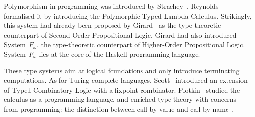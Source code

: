 \documentclass[11pt,twocolumn]{article}
\newcommand{\lcalculus}{\mbox{$\lambda$-calculus}}
\newcommand{\SystemF}{\mbox{System~$F$}}
\newcommand{\SystemFomega}{\mbox{System~$F_\omega$}}
\begin{document}
Polymorphism in programming %
was introduced by Strachey~\cite{Strachey1967}.
%
Reynolds~\cite{Reynolds} 
formalised 
it %
by introducing the Polymorphic Typed Lambda Calculus. 
Strikingly,
this system 
had already been proposed %
by
Girard~\cite{GirardSystemF} 
as the
type-theoretic counterpart of Second-Order Propositional Logic. 
Girard had
also introduced {\SystemFomega}, the type-theoretic counterpart of
Higher-Order Propositional Logic.  
{\SystemFomega} lies at the core of the Haskell programming
language. %

These %
type systems aim at %
logical foundations and %
only introduce terminating computations.  
As for
Turing
complete %
languages,
Scott~\cite{ScottTCS}
introduced an extension of Typed Combinatory Logic with a 
fixpoint combinator. %
Plotkin~\cite{PlotkinLCF} 
studied the calculus as a programming language, 
and enriched type theory with concerns from programming: the distinction
between call-by-value and call-by-name~\cite{PlotkinCBVCBN}.
\end{document}
